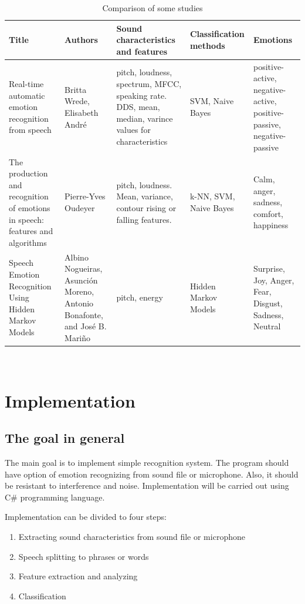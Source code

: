 \documentclass[14pt]{extarticle}
\begin{document}
\begin{table}[h]
	\small
	\begin{tabular}{|p{3cm}|p{3cm}|p{3cm}|p{3cm}|p{3cm}|}
		Title & Authors & Sound characteristics and features & Classification methods & Emotions \\ \hline
		Real-time automatic emotion recognition
		from speech & Britta Wrede, Elisabeth André & pitch, loudness, spectrum, MFCC, speaking rate. DDS, mean, median, varince values for characteristics & SVM, Naive Bayes & positive-active, negative-active, positive-passive, negative-passive\\ \hline
		The production and recognition of emotions in
		speech: features and algorithms & Pierre-Yves Oudeyer & pitch, loudness. Mean, variance, contour rising or falling features. & k-NN, SVM, Naive Bayes& Calm, anger, sadness, comfort, happiness\\ \hline
		Speech Emotion Recognition Using Hidden Markov Models & Albino Nogueiras, Asunción Moreno, Antonio Bonafonte, and José B. Mariño & pitch, energy & Hidden Markov Models & Surprise, Joy, Anger, Fear, Disgust, Sadness, Neutral \\\hline
	\end{tabular}
	\caption{Comparison of some studies}
	\
\end{table}
\section{Implementation}
\subsection{The goal in general}
The main goal is to implement simple recognition system. The program should have option of emotion recognizing from sound file or microphone. Also, it should be resistant to interference and noise. Implementation will be carried out using C\# programming language.

Implementation can be divided to four steps:
\begin{enumerate}
	\item Extracting sound characteristics from sound file or microphone
	\item Speech splitting to phrases or words
	\item Feature extraction and analyzing
	\item Classification
\end{enumerate}
\end{document}

